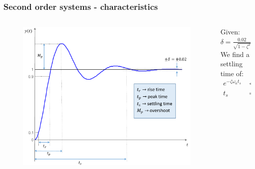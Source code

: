 \begin{frame}
\frametitle{Second order systems - characteristics}

\begin{columns}
\hspace{-2em}
	\begin{column}{0.65\textwidth}
		\begin{figure}
			\vspace{-1em}
			\includegraphics[width=1\linewidth]{tr_second_order_systems}
		\end{figure}
	\end{column}
		
	\begin{column}{0.35\textwidth}
		\vspace{-0.5em}
		\begin{example}
		{\footnotesize
			Given: $\delta = \frac{0.02}{\sqrt{1-\zeta^2}}$\\
			We find a settling time of:
			\begin{align*}
			e^{-\zeta\omega_n t_s} &< 0.02\\
			t_s &= \frac{4}{\omega_n\zeta}
			\end{align*}
			}
		\end{example}
	\end{column}

\end{columns}
\end{frame}

